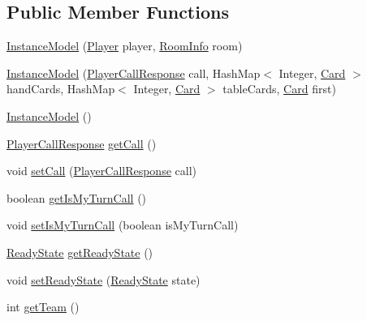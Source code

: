 \subsection*{Public Member Functions}
\begin{DoxyCompactItemize}
\item 
\mbox{\hyperlink{classClient_1_1Model_1_1InstanceModel_ad2f61d837a1d5b806b772d8a4a7430d8}{Instance\+Model}} (\mbox{\hyperlink{classCommon_1_1Player}{Player}} player, \mbox{\hyperlink{classCommon_1_1RoomInfo}{Room\+Info}} room)
\item 
\mbox{\hyperlink{classClient_1_1Model_1_1InstanceModel_acb00a285b30ad1851157852624d59499}{Instance\+Model}} (\mbox{\hyperlink{classCommon_1_1PlayerCallResponse}{Player\+Call\+Response}} call, Hash\+Map$<$ Integer, \mbox{\hyperlink{classCommon_1_1Card}{Card}} $>$ hand\+Cards, Hash\+Map$<$ Integer, \mbox{\hyperlink{classCommon_1_1Card}{Card}} $>$ table\+Cards, \mbox{\hyperlink{classCommon_1_1Card}{Card}} first)
\item 
\mbox{\hyperlink{classClient_1_1Model_1_1InstanceModel_a5393980d2fb01dd6bc13f88cbabb77f6}{Instance\+Model}} ()
\item 
\mbox{\hyperlink{classCommon_1_1PlayerCallResponse}{Player\+Call\+Response}} \mbox{\hyperlink{classClient_1_1Model_1_1InstanceModel_ad8583f69e6b0ca17a8a5849d1a6b72a3}{get\+Call}} ()
\item 
void \mbox{\hyperlink{classClient_1_1Model_1_1InstanceModel_a4ed6be9a9f752d23d38ff629bddf8c91}{set\+Call}} (\mbox{\hyperlink{classCommon_1_1PlayerCallResponse}{Player\+Call\+Response}} call)
\item 
boolean \mbox{\hyperlink{classClient_1_1Model_1_1InstanceModel_a41b625348d1dcd894b8f73b008d01d2f}{get\+Is\+My\+Turn\+Call}} ()
\item 
void \mbox{\hyperlink{classClient_1_1Model_1_1InstanceModel_a5dc1aac45a8a26c54f9a24ab791c94f9}{set\+Is\+My\+Turn\+Call}} (boolean is\+My\+Turn\+Call)
\item 
\mbox{\hyperlink{enumClient_1_1Model_1_1ReadyState}{Ready\+State}} \mbox{\hyperlink{classClient_1_1Model_1_1InstanceModel_acddabd74d9ec0d00b08f5fdbb84bb609}{get\+Ready\+State}} ()
\item 
void \mbox{\hyperlink{classClient_1_1Model_1_1InstanceModel_ae5d961affa08986ceedd6b771d740078}{set\+Ready\+State}} (\mbox{\hyperlink{enumClient_1_1Model_1_1ReadyState}{Ready\+State}} state)
\item 
int \mbox{\hyperlink{classClient_1_1Model_1_1InstanceModel_ab08b70b054c7c55685ea24af1dd25914}{get\+Team}} ()

\end{DoxyCompactItemize}
